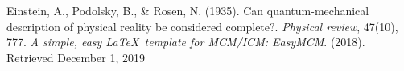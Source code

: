 
\begin{thebibliography}{99}
  \bibitem{} Einstein, A., Podolsky, B., \& Rosen, N. (1935). Can quantum-mechanical description of physical reality be considered complete?. \emph{Physical review}, 47(10), 777.
  \bibitem{} \emph{A simple, easy \LaTeX\ template for MCM/ICM: EasyMCM}. (2018). Retrieved December 1, 2019
\end{thebibliography}